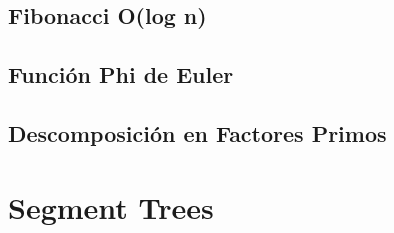 \documentclass[10pt,letterpaper,twocolumn,twosided]{article}
\newcommand{\codigofuente}[1]{

\dotfill
}
\begin{document}
\subsection{Fibonacci O(log n)}
\codigofuente{./teoria_numeros/fib.cpp}

\subsection{Función Phi de Euler}
\codigofuente{./teoria_numeros/phiEu.cpp}


\subsection{Descomposición en Factores Primos}
\codigofuente{./teoria_numeros/prim_factors.cpp}

\section{Segment Trees}
\codigofuente{./segment-tree/segment.cpp}
\end{document}
